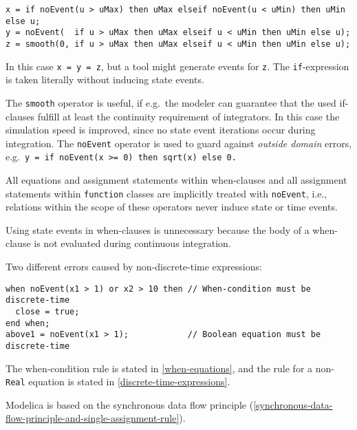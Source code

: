\begin{example}
\begin{lstlisting}[language=modelica]
x = if noEvent(u > uMax) then uMax elseif noEvent(u < uMin) then uMin else u;
y = noEvent(  if u > uMax then uMax elseif u < uMin then uMin else u);
z = smooth(0, if u > uMax then uMax elseif u < uMin then uMin else u);
\end{lstlisting}

In this case \lstinline!x = y = z!, but a tool might generate events for \lstinline!z!.
The \lstinline!if!-expression is taken literally without inducing state events.

The \lstinline!smooth! operator is useful, if e.g.\ the modeler can guarantee that the used if-clauses fulfill at least the continuity requirement of integrators.  In this case the simulation speed is improved, since no state event iterations occur during integration.  The \lstinline!noEvent! operator is used to guard against \emph{outside domain} errors, e.g.\ \lstinline!y = if noEvent(x >= 0) then sqrt(x) else 0.!
\end{example}

All equations and assignment statements within when-clauses and all assignment statements within \lstinline!function! classes are implicitly treated with \lstinline!noEvent!, i.e., relations within the scope of these operators never induce state or time events.

\begin{nonnormative}
Using state events in when-clauses is unnecessary because the body of a when-clause is not evaluated during continuous integration.
\end{nonnormative}

\begin{example}
Two different errors caused by non-discrete-time expressions:
\begin{lstlisting}[language=modelica]
when noEvent(x1 > 1) or x2 > 10 then // When-condition must be discrete-time
  close = true;
end when;
above1 = noEvent(x1 > 1);            // Boolean equation must be discrete-time
\end{lstlisting}
The when-condition rule is stated in \cref{when-equations}, and the rule for a non-\lstinline!Real! equation is stated in \cref{discrete-time-expressions}.
\end{example}

Modelica is based on the synchronous data flow principle (\cref{synchronous-data-flow-principle-and-single-assignment-rule}).

